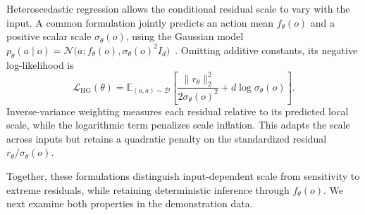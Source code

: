 Heteroscedastic regression allows the conditional residual scale to vary
with the input. A common formulation jointly predicts an action mean
$f_\theta(o)$ and a positive scalar scale $\sigma_\theta(o)$, using the
Gaussian model
$p_\theta(a\mid o)=\mathcal{N}\!\bigl(a;f_\theta(o),
\sigma_\theta(o)^2 I_d\bigr)$~\citep{nix1994estimating,seitzer2022pitfalls}.
Omitting additive constants, its negative log-likelihood is
\begin{equation}
    \mathcal{L}_{\mathrm{HG}}(\theta)
    = \mathbb{E}_{(o,a)\sim\mathcal{D}}
      \left[
        \frac{\lVert r_\theta\rVert_2^2}{2\sigma_\theta(o)^2}
        + d\log\sigma_\theta(o)
      \right].
    \label{eq:prelim-hg}
\end{equation}
Inverse-variance weighting measures each residual relative to its predicted
local scale, while the logarithmic term penalizes scale inflation.
This adapts the scale across inputs but retains a quadratic penalty on
the standardized residual $r_\theta/\sigma_\theta(o)$.

Together, these formulations distinguish input-dependent scale from
sensitivity to extreme residuals, while retaining deterministic inference
through $f_\theta(o)$. We next examine both properties in the demonstration
data.
